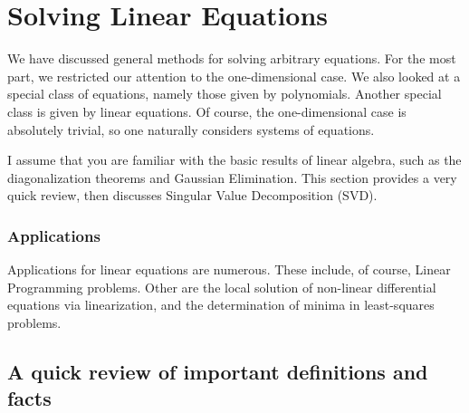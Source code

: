 \chapter{Solving Linear Equations}

We have discussed general methods for solving arbitrary equations. For the most part, we restricted our attention to the one-dimensional case. We also looked at a special class of equations, namely those given by polynomials. Another special class is given by linear equations. Of course, the one-dimensional case is absolutely trivial, so one naturally considers systems of equations. 

\noindent I assume that you are familiar with the basic results of linear algebra, such as the diagonalization theorems and Gaussian Elimination. This section provides a very quick review, then discusses Singular Value Decomposition (SVD).

\subsection*{Applications}

Applications for linear equations are numerous. These include, of course, Linear Programming problems. Other are the local solution of non-linear differential equations via linearization, and the determination of minima in least-squares problems. 

\newpage

\section{A quick review of important definitions and facts}

